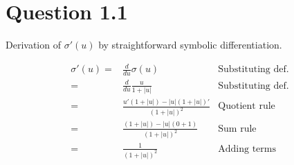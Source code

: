 \section*{Question 1.1}

	
	

Derivation of $\sigma'(u)$ by straightforward symbolic
differentiation.

\begin{align*}
  \sigma'(u)=&\frac{d}{du}\sigma(u) & \text{Substituting def.} \\
  =&\frac{d}{du}\frac{u}{1+|u|} & \text{Substituting def.} \\
  =&\frac{u'(1+|u|)-|u|(1+|u|)'}{(1+|u|)^2} & \text{Quotient rule}\\
  =&\frac{(1+|u|)-|u|(0+1)}{(1+|u|)^2} & \text{Sum rule}\\
  =&\frac{1}{(1+|u|)^2} & \text{Adding terms}\\
\end{align*}
